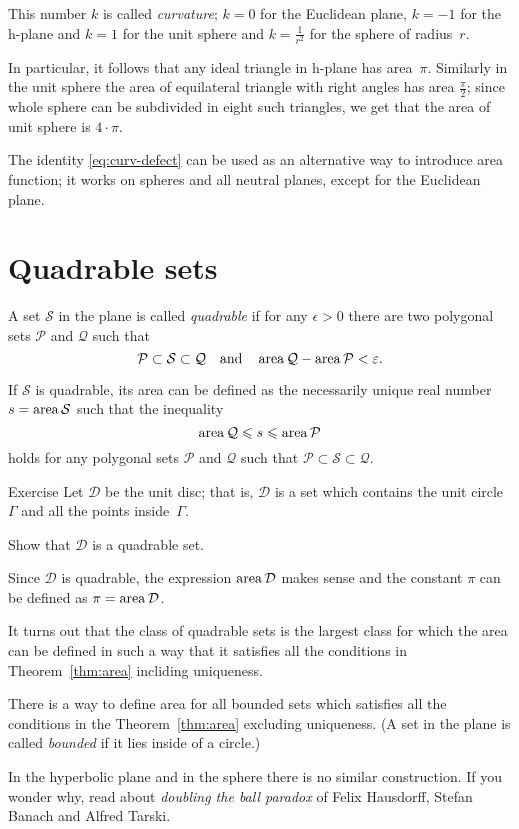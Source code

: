 This number $k$ is called \emph{curvature};
$k=0$ for the Euclidean plane,
$k=-1$ for the h-plane and $k=1$ for the unit sphere
and $k=\tfrac1{r^2}$ for the sphere of radius~$r$.

In particular, it follows that any ideal triangle in h-plane has area~$\pi$.
Similarly in the unit sphere the area of equilateral triangle with right angles has area $\tfrac\pi2$;
since whole sphere can be subdivided in eight such triangles, we get that the area of unit sphere is $4\cdot\pi$.

The identity \ref{eq:curv-defect} can be used as an alternative way to introduce area function; it works on spheres and all neutral planes, except for the Euclidean plane.

\section*{Quadrable sets}

A set $\mathcal{S}$ 
in the plane is called \emph{quadrable}
if for any $\epsilon>0$ there are two polygonal sets 
$\mathcal{P}$ and $\mathcal{Q}$
such that 
\[\mathcal{P}
\subset
\mathcal{S}\subset\mathcal{Q}
\quad
\text{and}
\quad
\mathop{\rm area}\nolimits\mathcal{Q}-\mathop{\rm area}\nolimits\mathcal{P}
<
\varepsilon.\]

If $\mathcal{S}$ is quadrable,
its area  can be defined 
as the necessarily unique real number $s=\mathop{\rm area}\nolimits\mathcal{S}$
such that the inequality
\[\mathop{\rm area}\nolimits\mathcal{Q}\leqslant s\leqslant \mathop{\rm area}\nolimits\mathcal{P}
\]
holds for any polygonal sets $\mathcal{P}$ and $\mathcal{Q}$ such that $\mathcal{P}\subset\mathcal{S}\subset\mathcal{Q}$.

\begin{thm}{Exercise}\label{ex:circle-is-quadrable}
Let $\mathcal{D}$ be the unit disc;
that is, $\mathcal{D}$ is a set which contains 
the unit circle $\Gamma$ and all the points inside~$\Gamma$.

Show that $\mathcal{D}$ is a quadrable set.
\end{thm}

Since $\mathcal{D}$ is quadrable, the expression $\mathop{\rm area}\nolimits\mathcal{D}$ makes sense and the constant $\pi$ can be defined as $\pi=\mathop{\rm area}\nolimits\mathcal{D}$.

\medskip

It turns out that the class of quadrable sets is the largest class for which 
the area can be defined in such a way that it satisfies all the conditions in Theorem~\ref{thm:area} incliding uniqueness.

There is a way to define area for all bounded sets
which satisfies all the conditions in the Theorem~\ref{thm:area} excluding uniqueness.
(A set in the plane is called \emph{bounded} if it lies inside of a circle.)

In the hyperbolic plane and in the sphere
there is no similar construction.
If you wonder why,
read about \emph{doubling the ball paradox} of Felix Hausdorff, Stefan Banach and Alfred Tarski.

